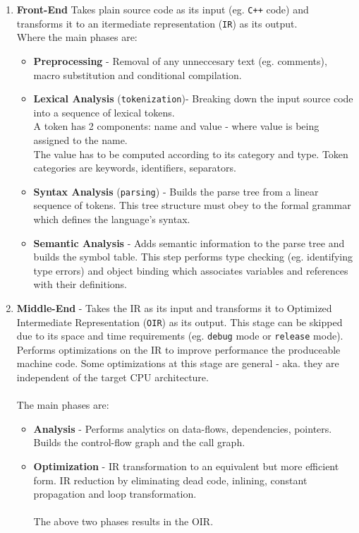 \documentclass{article}
\begin{document}
 \begin{enumerate}
  \item \textbf{Front-End} \- Takes plain source code as its input (eg. \texttt{C++} code) and transforms it to an itermediate representation (\texttt{IR}) as its output.
  \\
  Where the main phases are:
  \begin{itemize}
   \item \textbf{Preprocessing} \-- Removal of any unneccesary text (eg. comments), macro substitution and conditional compilation.
   \item \textbf{Lexical Analysis} (\texttt{tokenization})\-- Breaking down the input source code into a sequence of lexical tokens.
   \\
   A token has 2 components: name and value 
   \-- where value is being assigned to the name. 
   \\
   The value has to be computed according to its category and type.
   Token categories are keywords, identifiers, separators.
   \item \textbf{Syntax Analysis} (\texttt{parsing}) \-- Builds the parse tree from a linear sequence of tokens. This tree structure must obey to the formal grammar which defines
   the language's syntax.
   \item \textbf{Semantic Analysis} \-- Adds semantic information to the parse tree and builds the symbol table. This step performs type checking (eg. identifying type errors)
   and object binding which associates variables and references with their definitions.
  \end{itemize}
  
  \pagebreak
  
  \item \textbf{Middle-End} \-- Takes the IR as its input and transforms it to Optimized Intermediate Representation (\texttt{OIR}) as its output. This stage can be skipped due
  to its space and time requirements (eg. \texttt{debug} mode or \texttt{release} mode).
  \\
  Performs optimizations on the IR to improve performance the produceable machine code. 
  Some optimizations at this stage are general \-- aka. they are independent of the target CPU architecture.
  \\
  \\
  The main phases are:
  \begin{itemize}
   \item \textbf{Analysis} \-- Performs analytics on data-flows, dependencies, pointers. Builds the control-flow graph and the call graph.
   \item \textbf{Optimization} \-- IR transformation to an equivalent but more efficient form. IR reduction by eliminating dead code,
   inlining, constant propagation and loop transformation.
   \\
   \\
   The above two phases results in the OIR.
  \end{itemize}


\end{enumerate}
\end{document}
